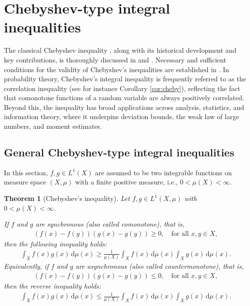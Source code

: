 \documentclass[12pt, reqno]{amsart}%
\theoremstyle{plain}  %
\newtheorem{theorem}{Theorem}[section]
\theoremstyle{definition}  %
\theoremstyle{remark}
\numberwithin{equation}{section}
\renewcommand{\d}{\,\mathrm{d}}
\begin{document}
\section{Chebyshev-type integral inequalities}
\label{sec:chebyshev-ineq}

The classical Chebyshev inequality \cite{Cheb82}, along with its historical development and key contributions, is thoroughly discussed in \cite[Chapter~X]{MPF93} and \cite{MiVa75,MiPe90}.   Necessary and sufficient conditions for the validity of Chebyshev's inequalities are established in \cite{Shi11}. In probability theory, Chebyshev's integral inequality is frequently referred to as the correlation inequality (see for instance Corollary \ref{cor:cheby}), reflecting the fact that comonotone functions of a random variable are always positively correlated. Beyond this, the inequality has broad applications across analysis, statistics, and information theory, where it underpins deviation bounds, the weak law of large numbers, and moment estimates. 

\subsection{General Chebyshev-type integral inequalities}
In this section, $f,g \in L^1(X)$ are assumed to be  two integrable functions on measure space $(X,\mu)$ with a  finite positive measure, i.e., $0 < \mu(X) < \infty$.
\begin{theorem}[Chebyshev's inequality]\label{thm:cheby}
Let $f,g \in L^1(X,\mu)$ with $0 < \mu(X) < \infty$.

If $f$ and $g$ are \emph{synchronous} (also called \emph{comonotone}), that is,
\begin{align*}
(f(x) - f(y))(g(x) - g(y)) \geq 0, \quad \text{for all } x,y \in X,
\end{align*}
then the following inequality holds:
\begin{align*}
\int_X f(x) g(x) \d\mu(x) \geq\frac{1}{\mu(X)}
\int_X f(x)\d\mu(x) \int_X g(x)\d\mu(x).
\end{align*}
Equivalently, if $f$ and $g$ are \emph{asynchronous}  (also called \emph{countermonotone}), that is,
\begin{align*}
(f(x) - f(y))(g(x) - g(y)) \leq 0, \quad \text{for all } x,y \in X,
\end{align*}
then the reverse inequality holds:
\begin{align*}
\int_X f(x) g(x) \d\mu(x) \leq\frac{1}{\mu(X)}
\int_X f(x)\d\mu(x) \int_X g(x)\d\mu(x).
\end{align*}
\end{theorem}
\end{document}
